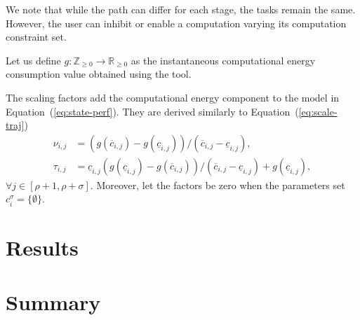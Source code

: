 We note that while the path can differ for each stage, the tasks remain the same. However, the user can inhibit or enable a computation varying its computation constraint set.

Let us define $g:\mathbb{Z}_{\geq 0}\rightarrow\mathbb{R}_{\geq 0}$ as the instantaneous computational energy consumption value obtained using the tool.

The scaling factors add the computational energy component to the model in Equation~(\ref{eq:state-perf}). They are derived similarly to Equation~(\ref{eq:scale-traj})
\begin{subequations}\begin{align}
  \nu_{i,j}&=(g(\overline{c}_{i,j})-g(\underline{c}_{i,j}))/(\overline{c}_{i,j}-\underline{c}_{i,j}),\\
  \tau_{i,j}&=\underline{c}_{i,j}(g(\underline{c}_{i,j})-g(\overline{c}_{i,j}))/(\overline{c}_{i,j}-\underline{c}_{i,j})+g(\underline{c}_{i,j}),
\end{align}\end{subequations}
$\forall j\in[\rho+1,\rho+\sigma]$. Moreover, let the factors be zero when the parameters set $c_i^\sigma=\{\emptyset\}$.



\section{Results}


\section{Summary}

